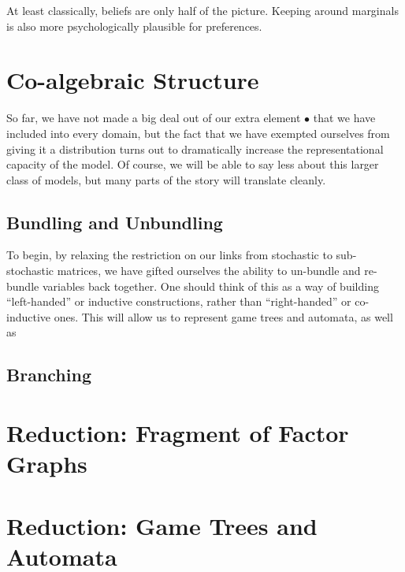 \documentclass{article}
\begin{document}
	At least classically, beliefs are only half of the picture. Keeping around marginals is also more psychologically plausible for preferences.
	
	
	\section{Co-algebraic Structure}
	So far, we have not made a big deal out of our extra element $\bullet$ that we have included into every domain, but the fact that we have exempted ourselves from giving it a distribution turns out to dramatically increase the representational capacity of the model. Of course, we will be able to say less about this larger class of models, but many parts of the story will translate cleanly.
	
	\subsection{Bundling and Unbundling} 
	To begin, by relaxing the restriction on our links from stochastic to sub-stochastic matrices, we have gifted ourselves the ability to un-bundle and re-bundle variables back together. One should think of this as a way of building ``left-handed'' or inductive constructions, rather than ``right-handed'' or co-inductive ones. This will allow us to represent game trees and automata, as well as
	
	\begin{center}
		\begin{tikzpicture}
		
		\end{tikzpicture}
	\end{center}
	
	\subsection{Branching}
	


	\section{Reduction: Fragment of Factor Graphs}
	\section{Reduction: Game Trees and Automata}
\end{document}
